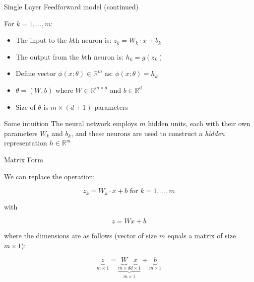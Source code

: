 \begin{frame}{Single Layer Feedforward model (continued)}
\begin{block}{For $k = 1, \ldots, m$:}
\begin{itemize}[<+->]
\item The input to the $k$th neuron is: 
\( z_k = W_k \cdot x + b_k \)
\item The output from the $k$th neuron is: 
\( h_k = g(z_k) \)
\item Define vector $\phi(x; \theta) \in \mathbb{R}^m$ as:
\( \phi(x; \theta) = h_k \)
\item $\theta = (W, b)$ where $W \in \mathbb{R}^{m \times d}$ and $b \in \mathbb{R}^d$
\item Size of $\theta$ is $m \times (d+1)$ parameters 
\end{itemize}
\end{block}
\pause
\begin{block}{Some intuition}
The neural network employs $m$ hidden units, each with their own parameters $W_k$ and $b_k$, and these neurons are used to construct a \textit{hidden} representation $h \in \mathbb{R}^m$
\end{block}
\end{frame}

\begin{frame}{Matrix Form}
\begin{block}{}
We can replace the operation:

\[ z_k = W_k \cdot x + b \textrm{ for } k = 1, \ldots, m \]

with

\[ z = Wx + b \]

where the dimensions are as follows (vector of size $m$ equals a matrix of size $m \times 1$):

\[ \underbrace{z}_{m \times 1} = \underbrace{\underbrace{W}_{m \times d} \underbrace{x}_{d \times 1}}_{m \times 1} + \underbrace{b}_{m \times 1} \]

\end{block}
\end{frame}

